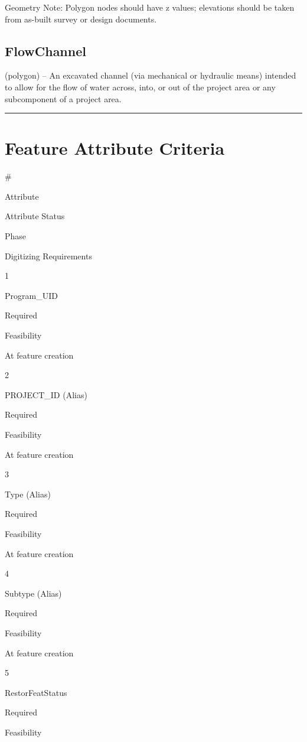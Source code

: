 \documentclass[
  letterpaper,
  DIV=11,
  numbers=noendperiod]{scrreprt}
\begin{document}
Geometry Note: Polygon nodes should have z values; elevations should be
taken from as-built survey or design documents.

\subsection{FlowChannel}\label{flowchannel}

(polygon) -- An excavated channel (via mechanical or hydraulic means)
intended to allow for the flow of water across, into, or out of the
project area or any subcomponent of a project area.

\begin{center}\rule{0.5\linewidth}{0.5pt}\end{center}

\section{Feature Attribute Criteria}\label{feature-attribute-criteria-5}

\#

Attribute

Attribute Status

Phase

Digitizing Requirements

1

Program\_UID

Required

Feasibility

At feature creation

2

PROJECT\_ID (Alias)

Required

Feasibility

At feature creation

3

Type (Alias)

Required

Feasibility

At feature creation

4

Subtype (Alias)

Required

Feasibility

At feature creation

5

RestorFeatStatus

Required

Feasibility
\end{document}
